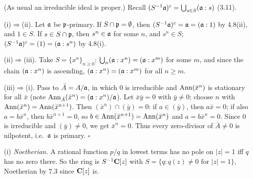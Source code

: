 \documentclass[11pt]{article}
\begin{document}
\pf
(As usual an irreducible ideal is proper.) Recall $(S^{-1}\mathfrak a)^c=\bigcup_{s\in S}(\mathfrak a:s)$ (3.11).

(i)$\Rightarrow$(ii). Let $\mathfrak a$ be $\mathfrak p$-primary. If $S\cap\mathfrak p=\emptyset$, then $(S^{-1}\mathfrak a)^c=\mathfrak a=(\mathfrak a:1)$ by 4.8(ii), and $1\in S$. If $s\in S\cap\mathfrak p$, then $s^n\in\mathfrak a$ for some $n$, and $s^n\in S$; $(S^{-1}\mathfrak a)^c=(1)=(\mathfrak a:s^n)$ by 4.8(i).

(ii)$\Rightarrow$(iii). Take $S=\{x^n\}_{n\ge0}$: $\bigcup_n(\mathfrak a:x^n)=(\mathfrak a:x^m)$ for some $m$, and since the chain $(\mathfrak a:x^n)$ is ascending, $(\mathfrak a:x^n)=(\mathfrak a:x^m)$ for all $n\ge m$.

(iii)$\Rightarrow$(i). Pass to $\bar A=A/\mathfrak a$, in which $0$ is irreducible and $\operatorname{Ann}(\bar x^n)$ is stationary for all $\bar x$ (note $\operatorname{Ann}_{\bar A}(\bar x^n)=(\mathfrak a:x^n)/\mathfrak a$). Let $\bar x\bar y=0$ with $\bar y\ne0$; choose $n$ with $\operatorname{Ann}(\bar x^n)=\operatorname{Ann}(\bar x^{n+1})$. Then $(\bar x^n)\cap(\bar y)=0$: if $a\in(\bar y)$, then $a\bar x=0$; if also $a=b\bar x^n$, then $b\bar x^{n+1}=0$, so $b\in\operatorname{Ann}(\bar x^{n+1})=\operatorname{Ann}(\bar x^n)$ and $a=b\bar x^n=0$. Since $0$ is irreducible and $(\bar y)\ne0$, we get $\bar x^n=0$. Thus every zero-divisor of $\bar A\ne0$ is nilpotent, i.e.\ $\mathfrak a$ is primary. \hfill$\square$

\pf
(i) \emph{Noetherian.} A rational function $p/q$ in lowest terms has no pole on $|z|=1$ iff $q$ has no zero there. So the ring is $S^{-1}\mathbf C[z]$ with $S=\{q:q(z)\ne0\text{ for }|z|=1\}$, Noetherian by 7.3 since $\mathbf C[z]$ is.
\end{document}
